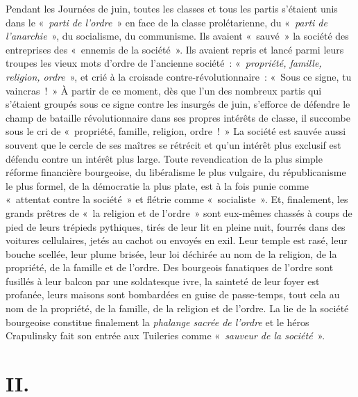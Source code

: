 \documentclass[french,twoside]{book} %
\newcommand\chapteropen{} %
\newcommand\chapterclose{} %
\begin{document}
Pendant les Journées de juin, toutes les classes et tous les partis s’étaient unis dans le « \emph{parti de l’ordre} » en face de la classe prolétarienne, du « \emph{parti de l’anarchie} », du socialisme, du communisme. Ils avaient « sauvé » la société des entreprises des « ennemis de la société ». Ils avaient repris et lancé parmi leurs troupes les vieux mots d’ordre de l’ancienne société : « \emph{propriété, famille, religion, ordre} », et crié à la croisade contre-révolutionnaire : « Sous ce signe, tu vaincras ! » À partir de ce moment, dès que l’un des nombreux partis qui s’étaient groupés sous ce signe contre les insurgés de juin, s’efforce de défendre le champ de bataille révolutionnaire dans ses propres intérêts de classe, il succombe sous le cri de « propriété, famille, religion, ordre ! » La société est sauvée aussi souvent que le cercle de ses maîtres se rétrécit et qu’un intérêt plus exclusif est défendu contre un intérêt plus large. Toute revendication de la plus simple réforme financière bourgeoise, du libéralisme le plus vulgaire, du républicanisme le plus formel, de la démocratie la plus plate, est à la fois punie comme « attentat contre la société » et flétrie comme « socialiste ». Et, finalement, les grands prêtres de « la religion et de l’ordre » sont eux-mêmes chassés à coups de pied de leurs trépieds pythiques, tirés de leur lit en pleine nuit, fourrés dans des voitures cellulaires, jetés au cachot ou envoyés en exil. Leur temple est rasé, leur bouche scellée, leur plume brisée, leur loi déchirée au nom de la religion, de la propriété, de la famille et de l’ordre. Des bourgeois fanatiques de l’ordre sont fusillés à leur balcon par une soldatesque ivre, la sainteté de leur foyer est profanée, leurs maisons sont bombardées en guise de passe-temps, tout cela au nom de la propriété, de la famille, de la religion et de l’ordre. La lie de la société bourgeoise constitue finalement la \emph{phalange sacrée de l’ordre} et le héros Crapulinsky fait son entrée aux Tuileries comme « \emph{sauveur de la société} ».
\chapterclose


\chapteropen
\chapter[II.]{II.}\renewcommand{\leftmark}{II.}
\end{document}
